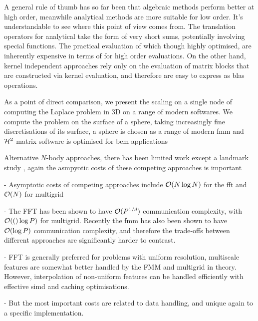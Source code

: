 A general rule of thumb has so far been that algebraic methods perform better at high order, meanwhile analytical methods are more suitable for low order. It's understandable to see where this point of view comes from. The translation operators for analytical  take the form of very short sums, potentially involving special functions. The practical evaluation of which though highly optimised, are inherently expensive in terms of  for high order evaluations. On the other hand, kernel independent approaches rely only on the evaluation of matrix blocks that are constructed via kernel evaluation, and therefore are easy to express as \acrshort{blas} operations.

As a point of direct comparison, we present the scaling on a single node of computing the Laplace problem in 3D on a range of modern softwares. We compute the problem on the surface of a sphere, taking increasingly fine discretisations of its surface, a sphere is chosen as a range of modern \acrshort{fmm} and $\mathcal{H}^2$ matrix software is optimised for \acrfull{bem} applications

Alternative $N$-body approaches, there has been limited work except a landmark study \cite{gholami2016fft}, again the asmpyotic costs of these competing approaches is important

- Asymptotic costs of competing approaches include $\mathcal{O}(N \log{N})$ for the \acrshort{fft} and $\mathcal{O}(N)$ for multigrid

- The FFT has been shown to have $\mathcal{O}(P^{1/d})$ communication complexity, with $\mathcal{O}(()\log{P})$ for multigrid. Recently the \acrshort{fmm} has also been shown to have $\mathcal{O}(\log{P})$ communication complexity, and therefore the trade-offs between different approaches are significantly harder to contrast.

- FFT is generally preferred for problems with uniform resolution, multiscale features are somewhat better handled by the FMM and multigrid in theory. However, interpolation of non-uniform features can be handled efficiently with effective \acrshort{simd} and caching optimisations.

- But the most important costs are related to data handling, and unique again to a specific implementation.